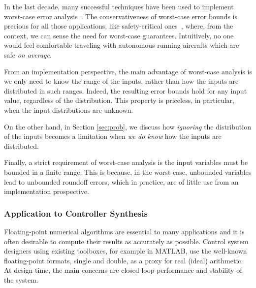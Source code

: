 In the last decade, many successful techniques have been used to implement worst-case error analysis~\cite{darulova2018daisy,2015_fm_sjrg,solovyev2018rigorous,rosa,fptuner,smartfloat,satire,gappa,fluctuat}.
%
%
The conservativeness of worst-case error bounds is precious for all those applications, like safety-critical ones~\cite{guardstable, cpralg}, where, from the context, we can sense the need for worst-case guarantees.
%
Intuitively, no one would feel comfortable traveling with autonomous running aircrafts which are safe \emph{on average}.

%
From an implementation perspective, the main advantage of worst-case analysis is we only need to know the range of the inputs, rather than how the inputs are distributed in such ranges. 
%
Indeed, the resulting error bounds hold for any input value, regardless of the distribution.
%
%
This property is priceless, in particular, when the input distributions are unknown.
%

On the other hand, in Section \ref{sec:prob}, we discuss how \emph{ignoring} the distribution of the inputs becomes a limitation when \emph{we do know} how the inputs are distributed.
%

Finally, a strict requirement of worst-case analysis is the input variables must be bounded  in a finite range. This is because, in the worst-case, unbounded variables lead to unbounded roundoff errors, which in practice, are of little use from an implementation prospective.
\subsubsection{Application to Controller Synthesis}
Floating-point numerical algorithms are essential to many applications and it is often desirable to compute their results as accurately as possible.
%
Control system designers using existing toolboxes, for example in MATLAB, use the well-known floating-point formats, single and double, as a proxy for real (ideal) arithmetic. 
%
At design time, the main concerns are closed-loop performance and stability of the system.
%

